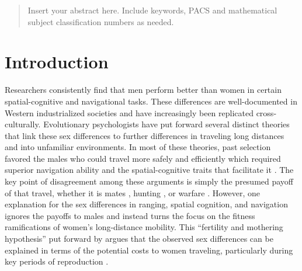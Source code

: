 
\date{Received: date / Accepted: date}


\maketitle

\begin{abstract}
Insert your abstract here. Include keywords, PACS and mathematical
subject classification numbers as needed.
\end{abstract}

\section{Introduction}
\label{sec:1}
Researchers consistently find  that men perform better than women in certain spatial-cognitive and navigational tasks.  These differences are well-documented in Western industrialized societies and have increasingly been replicated cross-culturally.  Evolutionary psychologists have put forward several distinct theories that link these sex differences to further differences in traveling long distances and into unfamiliar environments.  In most of these theories, past selection favored the males who could travel more safely and efficiently which required superior navigation ability and the spatial-cognitive traits that facilitate it \citep{jones2003evolution}.  The key point of disagreement among these arguments is simply the presumed payoff of that travel, whether it is mates \citep{gaulin1992evolution}, hunting \citep{eals1994hunter}, or warfare \citep{geary1995sexual}.  However, one explanation for the sex differences in ranging, spatial cognition, and navigation ignores the payoffs to males and instead turns the focus on the fitness ramifications of women's long-distance mobility.  This ``fertility and mothering hypothesis'' put forward by \citet{sherry1997evolution} argues that the observed sex differences can be explained in terms of the potential costs to women traveling, particularly during key periods of reproduction \citep{ecuyer2004have}.


